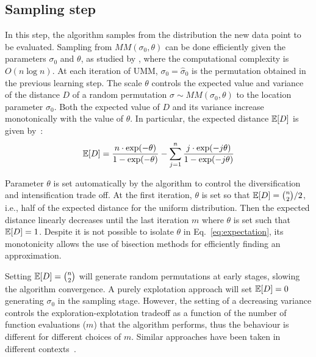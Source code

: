 \documentclass[sigconf,dvipsnames]{acmart}
\DeclareMathOperator*{\argmax}{arg\,max}
\begin{document}
\subsection{Sampling step}\label{sec:sampling}
In this step, the algorithm samples from the distribution the new data point to be evaluated. 
Sampling from $MM(\sigma_0,\theta)$  can be done efficiently given the parameters  $\sigma_0$ and $\theta$, as studied by \citet{IruCalLoz2016permallows}, where the computational complexity is $O(n\log n)$. %
%
At each iteration of UMM, $\sigma_0=\hat\sigma_0$ is the permutation obtained in the previous learning step. The scale $\theta$ controls the expected value and variance of the distance $D$ of a random permutation $\sigma\sim MM(\sigma_0, \theta)$ to the location parameter $\sigma_0$. Both  the expected value of $D$ and its variance increase monotonically with the value of $\theta$. In particular, the expected distance $\mathbb{E}[D]$ is given by~\cite{FliVer1986}:
%
\begin{equation}\label{eq:expectation}
\mathbb{E}[D] = \frac{n \cdot \exp(-\theta)}{1-\exp(-\theta)} - \sum_{j=1}^{n}  \frac{j\cdot\exp(-j  \theta)}{1-\exp(-j\theta)}
\end{equation}

Parameter $\theta$ is set automatically by the algorithm to control the diversification and intensification trade off. At the first iteration, $\theta$ is set so that  $\mathbb{E}[D] = \binom{n}{2} / 2$, i.e., half of the expected distance for the uniform distribution. 
Then the expected distance linearly decreases until the last iteration $m$ where $\theta$ is set such that $\mathbb{E}[D] = 1$. Despite it is not possible to isolate $\theta$ in Eq.~\eqref{eq:expectation}, its monotonicity allows the use of bisection methods for efficiently finding an approximation. 

Setting $\mathbb{E}[D] = \binom{n}{2}$ will generate random permutations at early stages, slowing the algorithm convergence. 
A purely explotation approach will set $\mathbb{E}[D] = 0$  generating $\sigma_0$ in the sampling stage. However, the setting of a decreasing variance   controls the exploration-explotation tradeoff as a function of the number of function evaluations ($m$) that the algorithm performs, thus the behaviour is different for different choices of $m$. Similar approaches have been taken in different contexts~\cite{ArzCebPer2019qap}. 

\end{document}
